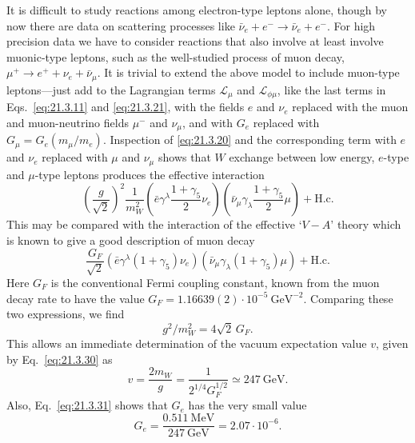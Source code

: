 It is difficult to study reactions among electron-type leptons alone, though by now there are data on scattering processes like $\bar\nu_e+e^-\to\bar\nu_e+e^-$. For high precision data we have to consider reactions that also involve at least involve muonic-type leptons, such as the well-studied process of muon decay, $\mu^+\to e^++\nu_e+\bar\nu_\mu$. It is trivial to extend the above model to include muon-type leptons---just add to the Lagrangian terms $\mathcal{L}_\mu$ and $\mathcal{L}_{\phi\mu}$, like the last terms in Eqs.~\eqref{eq:21.3.11} and \eqref{eq:21.3.21}, with the fields $e$ and $\nu_e$ replaced with the muon and muon-neutrino fields $\mu^-$ and $\nu_\mu$, and with $G_e$ replaced with $G_\mu=G_e(m_\mu/m_e)$. Inspection of \eqref{eq:21.3.20} and the corresponding term with $e$ and $\nu_e$ replaced with $\mu$ and $\nu_\mu$ shows that $W$ exchange between low energy, $e$-type and $\mu$-type leptons produces the effective interaction
\begin{equation}
\left(\frac{g}{\sqrt{2}}\right)^2\frac{1}{m_W^2}
\left(\bar e\gamma^\lambda\frac{1+\gamma_5}{2}\nu_e\right)
\left(\bar\nu_\mu\gamma_\lambda\frac{1+\gamma_5}{2}\mu\right)
+\mathrm{H.c.}
\tag{21.3.32}\label{eq:21.3.32}
\end{equation}
This may be compared with the interaction of the effective `$V-A$' theory which is known to give a good description of muon decay
\begin{equation}
\frac{G_F}{\sqrt{2}}
\left(\bar e\gamma^\lambda(1+\gamma_5)\nu_e\right)
\left(\bar\nu_\mu\gamma_\lambda(1+\gamma_5)\mu\right)
+\mathrm{H.c.}
\tag{21.3.33}\label{eq:21.3.33}
\end{equation}
Here $G_F$ is the conventional Fermi coupling constant, known from the muon decay rate to have the value $G_F=1.16639(2)\cdot10^{-5}\ \mathrm{GeV}^{-2}$. Comparing these two expressions, we find
\begin{equation}
g^2/m_W^2=4\sqrt{2}\,G_F.
\tag{21.3.34}\label{eq:21.3.34}
\end{equation}
This allows an immediate determination of the vacuum expectation value $v$, given by Eq.~\eqref{eq:21.3.30} as
\begin{equation}
v=\frac{2m_W}{g}
=\frac{1}{2^{1/4}G_F^{1/2}}
\simeq247\ \mathrm{GeV}.
\tag{21.3.35}\label{eq:21.3.35}
\end{equation}
Also, Eq.~\eqref{eq:21.3.31} shows that $G_e$ has the very small value
\begin{equation}
G_e=\frac{0.511\ \mathrm{MeV}}{247\ \mathrm{GeV}}
=2.07\cdot10^{-6}.
\tag{21.3.36}\label{eq:21.3.36}
\end{equation}
